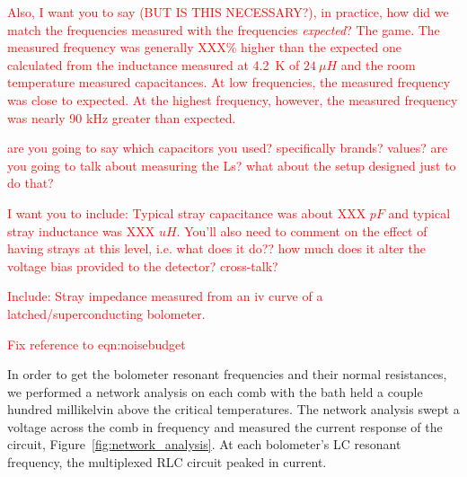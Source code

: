 \textcolor{red}{Also, I want you to say (BUT IS THIS NECESSARY?), in practice, how did we match the frequencies measured with the frequencies \textit{expected}? The game. The measured frequency was generally XXX\% higher than the expected one calculated from the inductance measured at 4.2~K of $24~\mu H$ and the room temperature measured capacitances. At low frequencies, the measured frequency was close to expected. At the highest frequency, however, the measured frequency was nearly 90 kHz greater than expected. }


\textcolor{red}{are you going to say which capacitors you used? specifically brands? values? are you going to talk about measuring the Ls? what about the setup designed just to do that?}

\textcolor{red}{I want you to include: Typical stray capacitance was about XXX $pF$ and typical stray inductance was XXX $uH$. You'll also need to comment on the effect of having strays at this level, i.e. what does it do?? how much does it alter the voltage bias provided to the detector? cross-talk? }

\textcolor{red}{Include: Stray impedance measured from an iv curve of a latched/superconducting bolometer.}

\textcolor{red}{Fix reference to eqn:noisebudget}


In order to get the bolometer resonant frequencies and their normal resistances, we performed a network analysis on each comb with the bath held a couple hundred millikelvin above the critical temperatures.
The network analysis swept a voltage across the comb in frequency and measured the current response of the circuit, Figure~\ref{fig:network_analysis}. 
At each bolometer's LC resonant frequency, the multiplexed RLC circuit peaked in current. 

